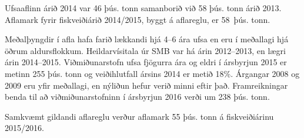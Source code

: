 Ufsaaflinn árið 2014 var 46 þús. tonn samanborið við 58 þús. tonn árið 2013.
Aflamark fyrir fiskveiðiárið 2014/2015, byggt á aflareglu, er 58~þús. tonn.

Meðalþyngdir í afla hafa farið lækkandi hjá 4--6 ára ufsa en eru í meðallagi hjá
öðrum aldursflokkum. Heildarvísitala úr SMB var há árin 2012--2013, en lægri
árin 2014--2015. Viðmiðunarstofn ufsa fjögurra ára og eldri í ársbyrjun 2015 er
metinn 255 þús. tonn og veiðihlutfall ársins 2014 er metið 18\%. Árgangar 2008
og 2009 eru yfir meðallagi, en nýliðun hefur verið minni eftir það.
Framreikningar benda til að viðmiðunarstofninn í ársbyrjun 2016 verði um 238
þús. tonn.

Samkvæmt gildandi aflareglu verður aflamark 55 þús. tonn á fiskveiðiárinu
2015/2016.
